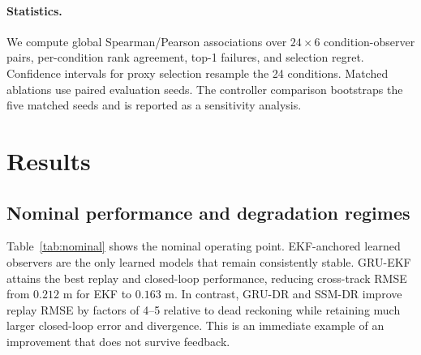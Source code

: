 \documentclass{article}
\begin{document}
\paragraph{Statistics.}
We compute global Spearman/Pearson associations over $24\times6$ condition-observer pairs, per-condition rank agreement, top-1 failures, and selection regret. Confidence intervals for proxy selection resample the 24 conditions. Matched ablations use paired evaluation seeds. The controller comparison bootstraps the five matched seeds and is reported as a sensitivity analysis.

\section{Results}
\subsection{Nominal performance and degradation regimes}
Table~\ref{tab:nominal} shows the nominal operating point. EKF-anchored learned observers are the only learned models that remain consistently stable. GRU-EKF attains the best replay and closed-loop performance, reducing cross-track RMSE from $0.212$ m for EKF to $0.163$ m. In contrast, GRU-DR and SSM-DR improve replay RMSE by factors of 4--5 relative to dead reckoning while retaining much larger closed-loop error and divergence. This is an immediate example of an improvement that does not survive feedback.
\end{document}
